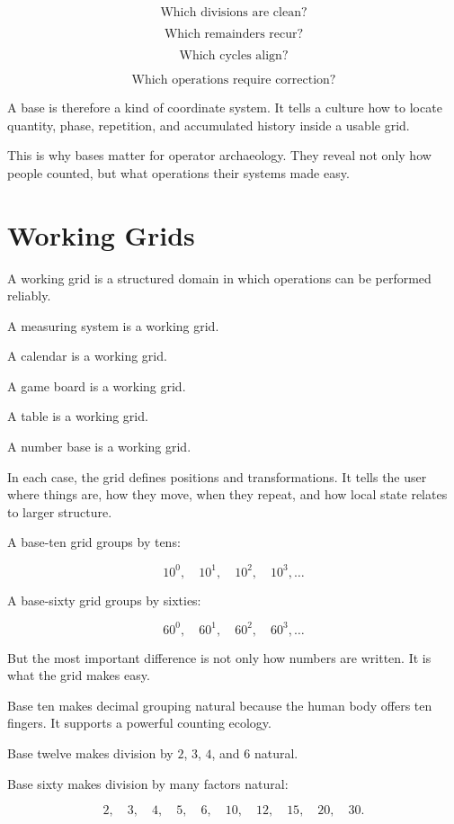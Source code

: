 \documentclass[11pt]{book}
\begin{document}
\[
\text{Which divisions are clean?}
\]

\[
\text{Which remainders recur?}
\]

\[
\text{Which cycles align?}
\]

\[
\text{Which operations require correction?}
\]

A base is therefore a kind of coordinate system. It tells a culture how to locate quantity, phase, repetition, and accumulated history inside a usable grid.

This is why bases matter for operator archaeology. They reveal not only how people counted, but what operations their systems made easy.

\section{Working Grids}

A working grid is a structured domain in which operations can be performed reliably.

A measuring system is a working grid.

A calendar is a working grid.

A game board is a working grid.

A table is a working grid.

A number base is a working grid.

In each case, the grid defines positions and transformations. It tells the user where things are, how they move, when they repeat, and how local state relates to larger structure.

A base-ten grid groups by tens:

\[
10^0,\quad 10^1,\quad 10^2,\quad 10^3,\ldots
\]

A base-sixty grid groups by sixties:

\[
60^0,\quad 60^1,\quad 60^2,\quad 60^3,\ldots
\]

But the most important difference is not only how numbers are written. It is what the grid makes easy.

Base ten makes decimal grouping natural because the human body offers ten fingers. It supports a powerful counting ecology.

Base twelve makes division by \(2\), \(3\), \(4\), and \(6\) natural.

Base sixty makes division by many factors natural:

\[
2,\quad 3,\quad 4,\quad 5,\quad 6,\quad 10,\quad 12,\quad 15,\quad 20,\quad 30.
\]
\end{document}
